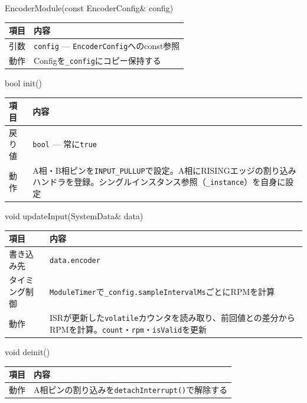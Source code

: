 \begin{funcblock}{EncoderModule(const EncoderConfig\& config)}
\begin{tabularx}{\textwidth}{l X}
\toprule
\textbf{項目} & \textbf{内容} \\
\midrule
引数   & \texttt{config} --- \texttt{EncoderConfig}へのconst参照 \\
動作   & Configを\texttt{\_config}にコピー保持する \\
\bottomrule
\end{tabularx}
\end{funcblock}

\begin{funcblock}{bool init()}
\begin{tabularx}{\textwidth}{l X}
\toprule
\textbf{項目} & \textbf{内容} \\
\midrule
戻り値   & \texttt{bool} --- 常に\texttt{true} \\
動作     & A相・B相ピンを\texttt{INPUT\_PULLUP}で設定。A相にRISINGエッジの割り込みハンドラを登録。シングルインスタンス参照（\texttt{\_instance}）を自身に設定 \\
\bottomrule
\end{tabularx}
\end{funcblock}

\begin{funcblock}{void updateInput(SystemData\& data)}
\begin{tabularx}{\textwidth}{l X}
\toprule
\textbf{項目} & \textbf{内容} \\
\midrule
書き込み先     & \texttt{data.encoder} \\
タイミング制御 & \texttt{ModuleTimer}で\texttt{\_config.sampleIntervalMs}ごとにRPMを計算 \\
動作           & ISRが更新した\texttt{volatile}カウンタを読み取り、前回値との差分からRPMを計算。\texttt{count}・\texttt{rpm}・\texttt{isValid}を更新 \\
\bottomrule
\end{tabularx}
\end{funcblock}

\begin{funcblock}{void deinit()}
\begin{tabularx}{\textwidth}{l X}
\toprule
\textbf{項目} & \textbf{内容} \\
\midrule
動作   & A相ピンの割り込みを\texttt{detachInterrupt()}で解除する \\
\bottomrule
\end{tabularx}
\end{funcblock}

